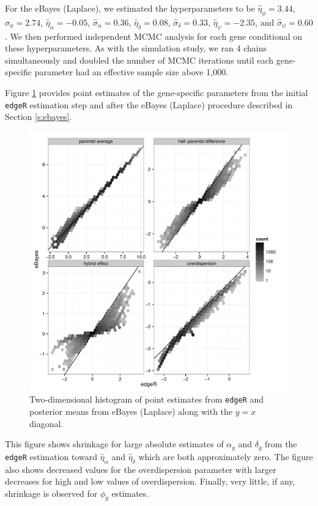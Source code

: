 \documentclass[useAMS,usenatbib,referee]{biom}
\newcommand{\edgeR}{{\tt edgeR}}
\begin{document}
For the eBayes (Laplace), we estimated the hyperparameters to be $\hat{\eta}_\phi = 3.44$, $\hat{\sigma}_\phi = 2.74$, $\hat{\eta}_\alpha = -0.05$, $\hat{\sigma}_\alpha=0.36$, $\hat{\eta}_\delta = 0.08$, $\hat{\sigma}_\delta=0.33$, $\hat{\eta}_\psi = -2.35$, and $\hat{\sigma}_\psi=0.60$. We then performed independent MCMC analysis for each gene conditional on these hyperparameters. As with the simulation study, we ran 4 chains simultaneously and doubled the number of MCMC iterations until each gene-specific parameter had an effective sample size above 1,000. 

Figure \ref{f:gene_specific_estimates} provides point estimates of the gene-specific parameters from the initial \edgeR{} estimation step and after the eBayes (Laplace) procedure described in Section \ref{s:ebayes}. 
\begin{figure}
\centerline{\includegraphics[width=\textwidth]{gene_specific_estimates.pdf}}
\caption{Two-dimensional histogram of point estimates from \edgeR{} and posterior means from eBayes (Laplace) along with the $y=x$ diagonal.}
\label{f:gene_specific_estimates}
\end{figure}
This figure shows shrinkage for large absolute estimates of $\alpha_g$ and $\delta_g$ from the \edgeR{} estimation toward $\hat{\eta}_\alpha$ and $\hat{\eta}_\delta$ which are both approximately zero. The figure also shows decreased values for the overdispersion parameter with larger decreases for high and low values of overdispersion. Finally, very little, if any, shrinkage is observed for $\phi_g$ estimates. 
\end{document}
